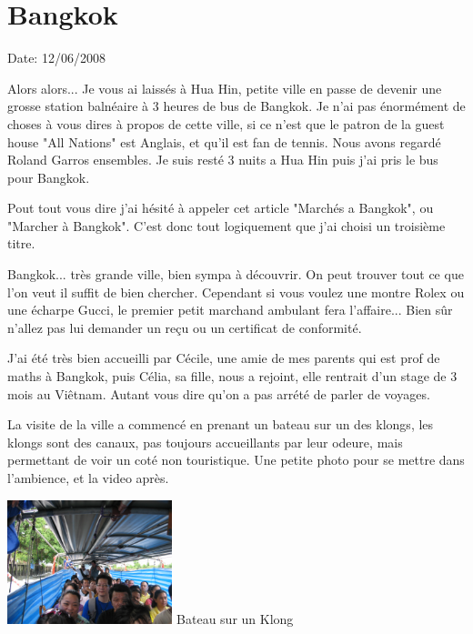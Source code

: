 \section{Bangkok}

Date: 12/06/2008

\begin{multicols}{2}

Alors alors... Je vous ai laissés à Hua Hin, petite ville en passe de devenir une grosse station balnéaire à 3 heures de bus de Bangkok. Je n'ai pas énormément de choses à vous dires à propos de cette ville, si ce n'est que le patron de la guest house "All Nations" est Anglais, et qu'il est fan de tennis. Nous avons regardé Roland Garros ensembles. Je suis resté 3 nuits a Hua Hin puis j'ai pris le bus pour Bangkok.

Pout tout vous dire j'ai hésité à appeler cet article "Marchés a Bangkok", ou "Marcher à Bangkok". C'est donc tout logiquement que j'ai choisi un troisième titre.

Bangkok... très grande ville, bien sympa à découvrir. On peut trouver tout ce que l'on veut il suffit de bien chercher. Cependant si vous voulez une montre Rolex ou une écharpe Gucci, le premier petit marchand ambulant fera l'affaire... Bien sûr n'allez pas lui demander un reçu ou un certificat de conformité.

J'ai été très bien accueilli par Cécile, une amie de mes parents qui est prof de maths à Bangkok, puis Célia, sa fille, nous a rejoint, elle rentrait d'un stage de 3 mois au Viêtnam. Autant vous dire qu'on a pas arrété de parler de voyages.

La visite de la ville a commencé en prenant un bateau sur un des klongs, les klongs sont des canaux, pas toujours accueillants par leur odeure, mais permettant de voir un coté non touristique. Une petite photo pour se mettre dans l'ambience, et la video après.

\hspace*{-0.65cm}
\includegraphics[width=4.8cm]{articles/Bangkok/1345.jpg}
Bateau sur un Klong



\end{multicols}
